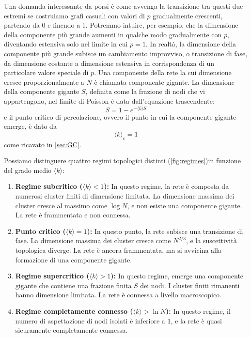 \documentclass[12pt,italian]{article}
\begin{document}
Una domanda interessante da porsi è come avvenga la transizione tra questi due estremi se costruiamo grafi casuali con valori di $p$ gradualmente crescenti, partendo da 0 e finendo a 1. Potremmo intuire, per esempio, che la dimensione della componente più grande aumenti in qualche modo gradualmente con $p$, diventando estensiva solo nel limite in cui $p = 1$. In realtà, la dimensione della componente più grande subisce un cambiamento improvviso, o transizione di fase, da dimensione costante a dimensione estensiva in corrispondenza di un particolare valore speciale di $p$. Una componente della rete la cui dimensione cresce proporzionalmente a $N$ è chiamata componente gigante. La dimensione della componente gigante $S$, definita come la frazione di nodi che vi appartengono, nel limite di Poisson è data dall'equazione trascendente:
\begin{equation}
    S = 1 - e^{-\langle k \rangle S}
    \label{eq:giant_comp}
\end{equation}
e il punto critico di percolazione, ovvero il punto in cui la componente gigante emerge, è dato da
\begin{equation}
    \langle k \rangle_c = 1
\end{equation}
come ricavato in \cref{sec:GC}.

Possiamo distinguere quattro regimi topologici distinti \cite{barabasi2016network} (\cref{fig:regimes})in funzione del grado medio $\langle k \rangle$:
\begin{enumerate}
    \renewcommand{\labelenumi}{\alph{enumi}.}
    \item \textbf{Regime subcritico ($\langle k \rangle < 1$):} In questo regime, la rete è composta da numerosi cluster finiti di dimensione limitata. La dimensione massima dei cluster cresce al massimo come $\log N$, e non esiste una componente gigante. La rete è frammentata e non connessa.

    \item \textbf{Punto critico ($\langle k \rangle = 1$):} In questo punto, la rete subisce una transizione di fase. La dimensione massima dei cluster cresce come $N^{2/3}$, e la suscettività topologica diverge. La rete è ancora frammentata, ma si avvicina alla formazione di una componente gigante.

    \item \textbf{Regime supercritico ($\langle k \rangle > 1$):} In questo regime, emerge una componente gigante che contiene una frazione finita $S$ dei nodi. I cluster finiti rimanenti hanno dimensione limitata. La rete è connessa a livello macroscopico.

    \item \textbf{Regime completamente connesso ($\langle k \rangle > \ln N$):} In questo regime, il numero di aspettazione di nodi isolati è inferiore a 1, e la rete è quasi sicuramente completamente connessa.
\end{enumerate}
\end{document}

